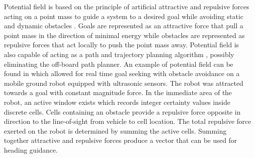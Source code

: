 \documentclass[conf]{new-aiaa}
\begin{document}
%
%
%
%



Potential field is based on the principle of artificial attractive and repulsive forces acting on a point mass to guide a system to a desired goal while avoiding static and dynamic obstacles \cite{khatib_real-time_1986}. Goals are represented as an attractive force that pull a point mass in the direction of minimal energy while obstacles are represented as repulsive forces that act locally to push the point mass away. Potential field is also capable of acting as a path and trajectory planning algorithm \cite{rimon_exact_1992}, possibly eliminating the off-board path planner. An example of potential field can be found in \cite{borenstein_real-time_1990,borenstein_vector_1991,koren_potential_1991} which allowed for real time goal seeking with obstacle avoidance on a mobile ground robot equipped with ultrasonic sensors. The robot was attracted towards a goal with constant magnitude force. In the immediate area of the robot, an active window exists which records integer certainty values inside discrete cells. Cells containing an obstacle provide a repulsive force opposite in direction to the line-of-sight from vehicle to cell location. The total repulsive force exerted on the robot is determined by summing the active cells. Summing together attractive and repulsive forces produce a vector that can be used for heading guidance. \\
\end{document}
